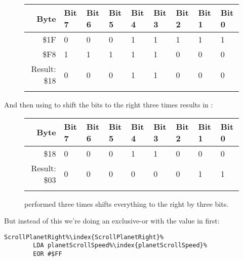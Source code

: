 \begin{figure}[H]
  {
    \setlength{\tabcolsep}{3.0pt}
    \setlength\cmidrulewidth{\heavyrulewidth} %
    \begin{adjustbox}{width=8cm,center}

      \begin{tabular}{rllllllll}
        \toprule
        Byte & Bit 7 & Bit 6 & Bit 5 & Bit 4 & Bit 3 & Bit 2 & Bit 1 & Bit 0        \\
        \midrule
        \$1F & 0 & 0 & 0 & 1 & 1 & 1 & 1 & 1 \\
        \$F8 & 1 & 1 & 1 & 1 & 1 & 0 & 0 & 0 \\
        \midrule
        Result: \$18 & 0 & 0 & 0 & 1 & 1 & 0 & 0 & 0 \\
        \addlinespace
        \bottomrule
      \end{tabular}
    \end{adjustbox}
  }
\end{figure}
\vspace{-0.05cm}

And then using  to shift the bits to the right three times results in :

\begin{figure}[H]
  {
    \setlength{\tabcolsep}{3.0pt}
    \setlength\cmidrulewidth{\heavyrulewidth} %
    \begin{adjustbox}{width=8cm,center}

      \begin{tabular}{rllllllll}
        \toprule
        Byte & Bit 7 & Bit 6 & Bit 5 & Bit 4 & Bit 3 & Bit 2 & Bit 1 & Bit 0        \\
        \midrule
        \$18 & 0 & 0 & 0 & 1 & 1 & 0 & 0 & 0 \\
        \midrule
        Result: \$03 & 0 & 0 & 0 & 0 & 0 & 0 & 1 & 1 \\
        \addlinespace
        \bottomrule
      \end{tabular}
    \end{adjustbox}
  }\caption{ performed three times shifts everything to the right by three bits.}
\end{figure}
\vspace{-0.05cm}

But instead of this we're doing an exclusive-or with the value in  first:

\begin{lstlisting}[escapechar=\%]
ScrollPlanetRight%\index{ScrollPlanetRight}%   
        LDA planetScrollSpeed%\index{planetScrollSpeed}%
        EOR #$FF
\end{lstlisting}

